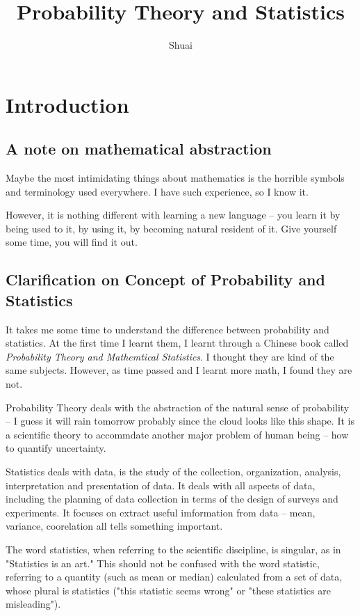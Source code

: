 \documentclass[a4paper]{book}
\title{Probability Theory and Statistics}
\author{Shuai}
\date{}
\newenvironment{remark}[1][Remark]{\begin{trivlist}
\item[\hskip \labelsep {\bfseries #1}]}{\end{trivlist}}
\begin{document}
\maketitle
\tableofcontents
\pagebreak

\chapter{Introduction}

\section{A note on mathematical abstraction}

	Maybe the most intimidating things about mathematics is the horrible
	symbols and terminology used everywhere. I have such experience, so I
	know it.

	However, it is nothing different with learning a new language -- you
	learn it by being used to it, by using it, by becoming natural
	resident of it. Give yourself some time, you will find it out.

\section{Clarification on Concept of Probability and Statistics}

	It takes me some time to understand the difference between probability
	and statistics. At the first time I learnt them, I learnt through a
	Chinese book called \textit{Probability Theory and Mathemtical
	Statistics}. I thought they are kind of the same subjects. However, as
	time passed and I learnt more math, I found they are not.

	Probability Theory deals with the abstraction of the natural sense of
	probability -- I guess it will rain tomorrow probably since the cloud
	looks like this shape. It is a scientific theory to accommdate another
	major problem of human being -- how to quantify uncertainty.

	Statistics deals with data, is the study of the collection,
	organization, analysis, interpretation and presentation of data.  It
	deals with all aspects of data, including the planning of data
	collection in terms of the design of surveys and
	experiments.\cite{wiki_statistics} It focuses on extract useful
	imformation from data -- mean, variance, coorelation all tells
	something important.

	\begin{remark}
		The word statistics, when referring to the scientific discipline, is
		singular, as in "Statistics is an art." This should not be confused
		with the word statistic, referring to a quantity (such as mean or
		median) calculated from a set of data, whose plural is statistics
		("this statistic seems wrong" or "these statistics are
		misleading").\cite{wiki_statistics}
	\end{remark}
\end{document}

